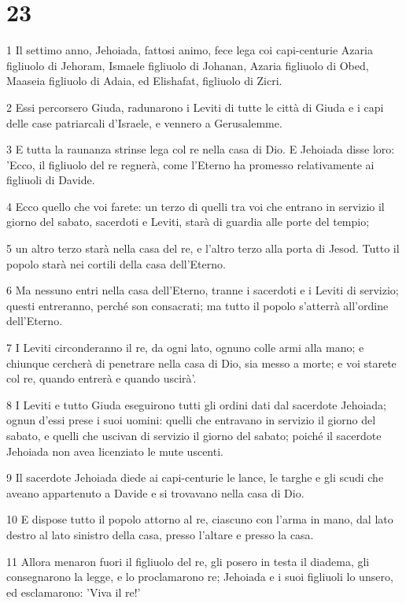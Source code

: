 \chapter{23}

\par 1 Il settimo anno, Jehoiada, fattosi animo, fece lega coi capi-centurie Azaria figliuolo di Jehoram, Ismaele figliuolo di Johanan, Azaria figliuolo di Obed, Maaseia figliuolo di Adaia, ed Elishafat, figliuolo di Zicri.
\par 2 Essi percorsero Giuda, radunarono i Leviti di tutte le città di Giuda e i capi delle case patriarcali d'Israele, e vennero a Gerusalemme.
\par 3 E tutta la raunanza strinse lega col re nella casa di Dio. E Jehoiada disse loro: 'Ecco, il figliuolo del re regnerà, come l'Eterno ha promesso relativamente ai figliuoli di Davide.
\par 4 Ecco quello che voi farete: un terzo di quelli tra voi che entrano in servizio il giorno del sabato, sacerdoti e Leviti, starà di guardia alle porte del tempio;
\par 5 un altro terzo starà nella casa del re, e l'altro terzo alla porta di Jesod. Tutto il popolo starà nei cortili della casa dell'Eterno.
\par 6 Ma nessuno entri nella casa dell'Eterno, tranne i sacerdoti e i Leviti di servizio; questi entreranno, perché son consacrati; ma tutto il popolo s'atterrà all'ordine dell'Eterno.
\par 7 I Leviti circonderanno il re, da ogni lato, ognuno colle armi alla mano; e chiunque cercherà di penetrare nella casa di Dio, sia messo a morte; e voi starete col re, quando entrerà e quando uscirà'.
\par 8 I Leviti e tutto Giuda eseguirono tutti gli ordini dati dal sacerdote Jehoiada; ognun d'essi prese i suoi uomini: quelli che entravano in servizio il giorno del sabato, e quelli che uscivan di servizio il giorno del sabato; poiché il sacerdote Jehoiada non avea licenziato le mute uscenti.
\par 9 Il sacerdote Jehoiada diede ai capi-centurie le lance, le targhe e gli scudi che aveano appartenuto a Davide e si trovavano nella casa di Dio.
\par 10 E dispose tutto il popolo attorno al re, ciascuno con l'arma in mano, dal lato destro al lato sinistro della casa, presso l'altare e presso la casa.
\par 11 Allora menaron fuori il figliuolo del re, gli posero in testa il diadema, gli consegnarono la legge, e lo proclamarono re; Jehoiada e i suoi figliuoli lo unsero, ed esclamarono: 'Viva il re!'
